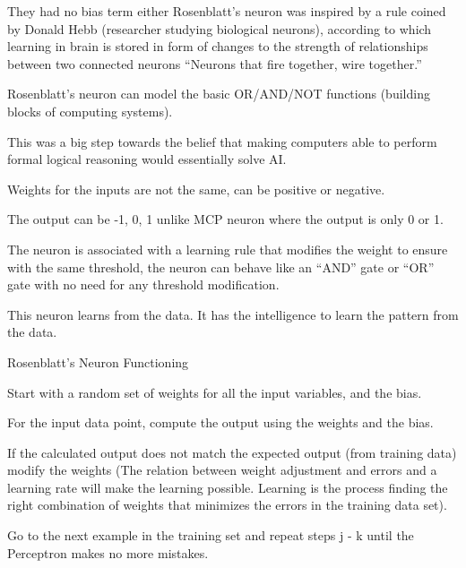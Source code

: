 \begin{bulletedlist}
		\item They had no bias term either Rosenblatt's neuron was inspired by a rule coined by Donald Hebb (researcher studying biological neurons), according to which learning in brain is stored in form of changes to the strength of relationships between two connected neurons ``Neurons that fire together, wire together.''
		\item Rosenblatt's neuron can model the basic OR/AND/NOT functions (building blocks of computing systems).
		\item This was a big step towards the belief that making computers able to perform formal logical reasoning would essentially solve AI.
		\item Weights for the inputs are not the same, can be positive or negative.
		\item The output can be -1, 0, 1 unlike MCP neuron where the output is only 0 or 1.
		\item The neuron is associated with a learning rule that modifies the weight to ensure with the same threshold, the neuron can behave like an ``AND'' gate or ``OR'' gate with no need for any threshold modification.
		\item This neuron learns from the data. It has the intelligence to learn the pattern from the data.
	\end{bulletedlist}

Rosenblatt's Neuron Functioning
	\begin{numberedlist}
		\item Start with a random set of weights for all the input variables, and the bias.
		\item For the input data point, compute the output using the weights and the bias.
		\item If the calculated output does not match the expected output (from training data) modify the weights (The relation between weight adjustment and errors and a learning rate will make the learning possible. Learning is the process finding the right combination of weights that minimizes the errors in the training data set).
		\item Go to the next example in the training set and repeat steps j - k until the Perceptron makes no more mistakes.
	\end{numberedlist}

